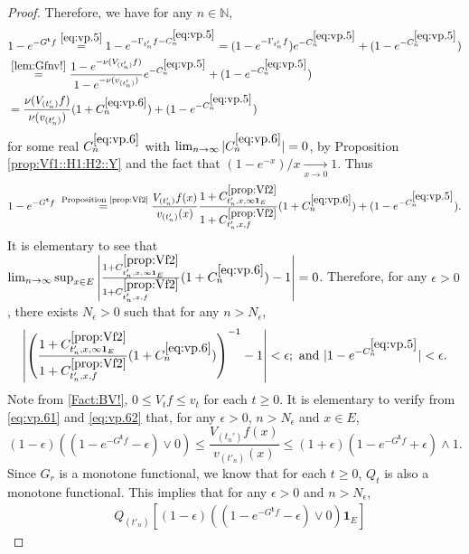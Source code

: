 \documentclass[12pt,a4paper]{amsart}
\numberwithin{equation}{section}
\theoremstyle{plain}
\theoremstyle{definition}
\theoremstyle{remark}
\begin{document}
\begin{proof}
	
Therefore, we have for any $n \in \mathbb N$,
\begin{align}
	& 1 - e^{- G^{\mathbf t}f}
	\overset{\eqref{eq:vp.5}}= 1 - e^{- \Gamma_{t'_n} f  - C^{\eqref{eq:vp.5}}_n}
	= (1 - e^{- \Gamma_{t'_n} f }) e^{- C^{\eqref{eq:vp.5}}_n} + (1 - e^{-C_n^{\eqref{eq:vp.5}}})
	\\&\overset{\eqref{lem:Gfnv!}}= \frac{1 - e^{- \nu( V_{(t_n')}f)}}{1- e^{- \nu(v_{(t_n')})}}  e^{ - C^{\eqref{eq:vp.5}}_n} + (1 - e^{-C_n^{\eqref{eq:vp.5}}})
	\\& \label{eq:vp.6}= \frac{\nu (V_{(t_n')} f)}{\nu(v_{(t_n')})}  (1+C^{\eqref{eq:vp.6}}_n) + (1 - e^{-C_n^{\eqref{eq:vp.5}}})
\end{align}
	for some real $C^{\eqref{eq:vp.6}}_n$ with $\lim_{n\to \infty} |C^{\eqref{eq:vp.6}}_n| =0$, by Proposition \ref{prop:Vf1::H1:H2::Y} and the fact that $(1- e^{-x})/x \xrightarrow[x\to 0]{}1$.
	Thus
\begin{equation} \label{eq:vp.61}
	1 - e^{- G^{\mathbf t}f}
	\overset{\text{ Proposition \ref{prop:Vf2}}}=  \frac{V_{(t_n')}f(x)}{v_{(t_n')}(x)} \frac{1+C^{\ref{prop:Vf2}}_{t_n',x,\infty \mathbf 1_E}}{1+C^{\ref{prop:Vf2}}_{t_n',x,f}} (1+C^{\eqref{eq:vp.6}}_n) + (1 - e^{-C_n^{\eqref{eq:vp.5}}}).
\end{equation}
	It is elementary to see that $\lim_{n\to \infty} \sup_{x\in E} \left|\frac{1+C^{\ref{prop:Vf2}}_{t_n',x,\infty \mathbf 1_E}}{1+C^{\ref{prop:Vf2}}_{t_n',x,f}} (1+C^{\eqref{eq:vp.6}}_n) -1 \right| = 0$.
	Therefore, for any $\epsilon > 0$, there exists $N_\epsilon>0$ such that for any $n>N_\epsilon$,
\begin{equation} \label{eq:vp.62}
	\left| \left(\frac{1+C^{\ref{prop:Vf2}}_{t_n',x,\infty \mathbf 1_E}}{1+C^{\ref{prop:Vf2}}_{t_n',x,f}} (1+C^{\eqref{eq:vp.6}}_n)\right)^{-1} -1 \right| < \epsilon;
	\text{~and~} |1 - e^{-C_n^{\eqref{eq:vp.5}}}| < \epsilon.
\end{equation}
	Note from \eqref{Fact:BV!}, $0 \leq V_tf \leq v_t$ for each $t\geq 0$.
	It is elementary to verify from \eqref{eq:vp.61} and \eqref{eq:vp.62} that, for any $\epsilon>0$, $n>N_\epsilon$ and $x\in E$,
\[
	(1-\epsilon) \left((1 - e^{- G^{\mathbf t}f} - \epsilon)\vee 0\right)
	\leq \frac{V_{(t_n')}f(x)}{v_{(t'_n)}(x)}
	\leq (1+\epsilon) ( 1 - e^{- G^{\mathbf t}f} + \epsilon) \wedge 1.
\]
	Since $G_r$ is a monotone functional, we know that for each $t\geq 0$, $Q_t$ is also a monotone functional.
	This implies that  for any $\epsilon>0$ and $n>N_\epsilon$,
\begin{align} \label{eq:vp.7}
	&Q_{(t'_n)} \left[(1-\epsilon) \left((1 - e^{- G^{\mathbf t}f} - \epsilon)\vee 0\right) \mathbf 1_E \right]

\end{align}
\end{proof}
\end{document}
